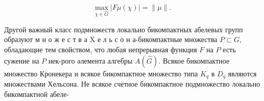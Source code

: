 \documentclass[10pt]{article}
\begin{document}
\[

\max _{\chi \in \widehat{G}}|F \mu(\chi)|=\|\mu\| \text {. }

\]



Другой важный класс подмножеств локально бикомпактных абелевых групп образуют м н о ж е с т в а $\mathrm{X}$ е л ь с о н а-бикомпактные множества $P \subset G, \quad$ обладающие тем свойством, что любая непрерывная функция $F$ на $P$ есть сужение на $P$ нек-рого әлемента алгебры $A(\hat{G})$. Всякое бикомпактное множество Кронекера и всякое бикомпактное множество типа $K_{q}$ в $D_{q}$ являются множествами Хельсона. Не всякое счетное бикомпактное подмножество локально бикомпактной абеле-
\end{document}
